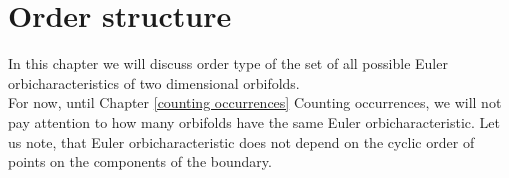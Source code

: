 \chapter{Order structure} \label{order structure}
%
%
%
In this chapter we will discuss order type of the set of all possible Euler orbicharacteristics 
of two dimensional orbifolds. \\

For now, until Chapter \ref{counting occurrences} Counting occurrences, we will not pay attention 
to how many orbifolds have the same Euler orbicharacteristic. Let us note, that 
Euler orbicharacteristic does not depend on the cyclic order of points on 
the components of the boundary. 





